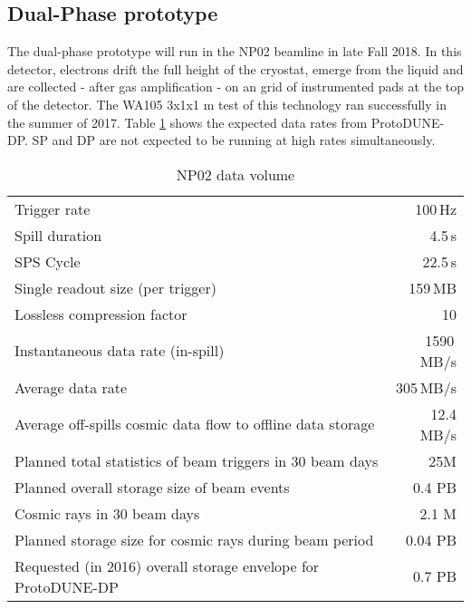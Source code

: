 \subsection{Dual-Phase prototype}

The dual-phase prototype will run in the NP02 beamline in late Fall 2018.  In this detector, electrons drift the full height of the cryostat, emerge from the liquid and are collected - after gas amplification - on an grid of instrumented pads at the top of the detector.  The WA105 3x1x1 m test of this technology ran successfully in the summer of 2017\cite{Murphy:20170516}.  Table \ref{tab:np02_data_rate} shows the expected data rates from ProtoDUNE-DP.   SP and DP are not expected to be running at high rates simultaneously. 

\begin{table}[htbp]
  \centering
  \begin{tabular}[h]{l|r}
\hline
   Trigger rate & 100\,Hz \\
    Spill duration & 4.5\,s\\
    SPS Cycle & 22.5\,s \\
    Single readout size (per trigger) & 159\,MB \\
    Lossless compression factor & 10\\
    Instantaneous data rate (in-spill) & 1590\,MB/s \\
    Average data rate & 305\,MB/s \\
    \hline
   Average off-spills cosmic data flow to offline data storage &   12.4 MB/s\\
    Planned total statistics of beam triggers in 30 beam days &25M\\
    Planned overall storage size of beam events&   0.4 PB\\
   Cosmic rays in 30  beam days&  2.1  M\\
   Planned storage size for cosmic rays during beam period&  0.04 PB\\
   Requested (in 2016) overall storage envelope for ProtoDUNE-DP&0.7 PB \\
    \hline
  \end{tabular}
 \caption{NP02 data volume}
  \label{tab:np02_data_rate}
\end{table}

